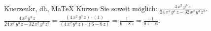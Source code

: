 \begin{MAufgabe}{Kuerzen}{kr, dh, MaTeX}
K\"urzen Sie soweit m\"oglich: $\frac{4\, x^2\, y^3\, z}{24\, x^2\, y^3\, z - 32\, x^2\, y^3\, z^2}$.\\ 
\ifLsg\MLoesung
\quad $\frac{4\, x^2\, y^3\, z}{24\, x^2\, y^3\, z - 32\, x^2\, y^3\, z^2}=\frac{(4\, x^2\, y^3\, z)\cdot(1)}{(4\, x^2\, y^3\, z)\cdot(6 - 8\, z)}=\frac{1}{6 - 8\, z}=\frac{-1}{8\, z - 6}$.\else\relax\fi
 \end{MAufgabe}